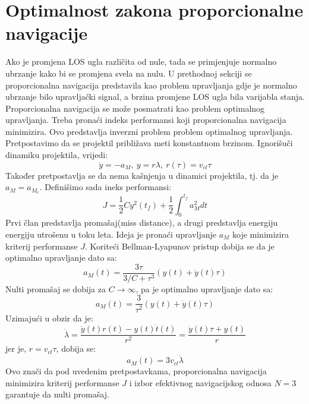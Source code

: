 \section{Optimalnost zakona proporcionalne navigacije}
Ako je promjena LOS ugla različita od nule, tada se primjenjuje normalno ubrzanje kako bi 
se promjena svela na nulu. U prethodnoj sekciji se proporcionalna navigacija predstavila kao 
problem upravljanja gdje je normalno ubrzanje bilo upravljački signal, a brzina promjene LOS ugla bila varijabla stanja.
Proporcionalna navigacija se može posmatrati kao problem optimalnog upravljanja. Treba pronaći indeks performansi koji 
proporcionalna navigacija minimizira. Ovo predstavlja inverzni problem problem optimalnog upravljanja. Pretpostavimo da 
se projektil približava meti konstantnom brzinom. Ignorišuči dinamiku projektila, vrijedi:
\begin{equation}
    \ddot{y}=-a_M,\ y=r\lambda,\ r(\tau)=v_{cl}\tau
\end{equation}
Također pretpostavlja se da nema kašnjenja u dinamici projektila, tj. da je $a_M = a_{M_c}$.
Definišimo sada ineks performansi:
\begin{equation}
    J=\frac{1}{2}Cy^2(t_f)+\frac{1}{2}\int_0^{t_f}{a_M^2dt}
\end{equation}
Prvi član predstavlja promašaj(miss distance), a drugi predstavlja energiju energiju utrošenu u toku leta. Ideja je pronaći upravljanje
$a_M$ koje minimizira kriterij performanse $J$. Koriteći Bellman-Lyapunov pristup dobija se da je 
optimalno upravljanje dato sa:
\begin{equation}
    a_M(t)=\frac{3\tau}{3/C+\tau ^3}(y(t)+\dot{y}(t)\tau)
\end{equation}
Nulti promašaj se dobija za $C\rightarrow \infty$, pa je optimalno upravljanje dato sa:
\begin{equation}
    a_M(t)=\frac{3}{\tau ^2}(y(t)+\dot{y}(t)\tau)
\end{equation}
Uzimajući u obzir da je:
\begin{equation}
    \dot{\lambda} = \frac{\dot{y}(t)r(t)-y(t)\dot{t}(t)}{r^2}=\frac{\dot{y}(t)\tau + y(t)}{r}
\end{equation}
jer je, $r=v_{cl}\tau$, dobija se:
\begin{equation}
    a_M(t)=3v_{cl}\dot{\lambda}
\end{equation}
Ovo znači da pod uvedenim pretpostavkama, proporcionalna navigacija minimizira kriterij performanse
$J$ i izbor efektivnog navigacijskog odnosa $N=3$ garantuje da nulti promašaj. 
